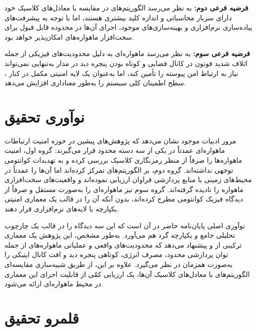 \documentclass[a4paper,14pt]{extreport}
\begin{document}
\textbf{فرضیه فرعی دوم:} به نظر می‌رسد الگوریتم‌های  در مقایسه با معادل‌های کلاسیک خود دارای سربار محاسباتی و اندازه کلید بیشتری هستند، اما با توجه به پیشرفت‌های پیاده‌سازی نرم‌افزاری و بهینه‌سازی‌های موجود، اجرای آن‌ها در محدوده قابل قبول برای سخت‌افزار ماهواره‌های  امکان‌پذیر خواهد بود.

\textbf{فرضیه فرعی سوم:} به نظر می‌رسد  ماهواره‌ای به دلیل محدودیت‌های فیزیکی  از جمله اتلاف شدید فوتون در کانال فضایی و کوتاه بودن پنجره دید در مدار   به‌تنهایی نمی‌تواند نیاز به ارتباط امن پیوسته را تأمین کند، اما به‌عنوان یک لایه امنیتی مکمل در کنار ، سطح اطمینان کلی سیستم را به‌طور معناداری افزایش می‌دهد.

\section{نوآوری تحقیق}

مرور ادبیات موجود نشان می‌دهد که پژوهش‌های پیشین در حوزه امنیت ارتباطات ماهواره‌ای عمدتاً در یکی از سه دسته محدود قرار می‌گیرند: گروه اول، امنیت ماهواره‌ها را صرفاً از منظر رمزنگاری کلاسیک  بررسی کرده و به تهدیدات کوانتومی توجهی نداشته‌اند. گروه دوم، بر الگوریتم‌های  تمرکز کرده‌اند اما آن‌ها را عمدتاً در محیط‌های زمینی با منابع پردازشی فراوان ارزیابی نموده‌اند و واقعیت‌های سخت‌افزاری ماهواره را نادیده گرفته‌اند. گروه سوم نیز  ماهواره‌ای را به‌صورت مستقل و صرفاً از دیدگاه فیزیک کوانتومی مطرح کرده‌اند، بدون آنکه آن را در قالب یک معماری امنیتی یکپارچه با لایه‌های نرم‌افزاری قرار دهند.

نوآوری اصلی پایان‌نامه حاضر در آن است که این سه دیدگاه را در قالب یک چارچوب تحلیلی جامع و یکپارچه گرد هم می‌آورد. به‌طور مشخص، این پژوهش یک معماری ترکیبی  از  و  پیشنهاد می‌دهد که محدودیت‌های واقعی و عملیاتی ماهواره‌های   از جمله توان پردازشی محدود، مصرف انرژی، کوتاهی پنجره دید و افت کانال اپتیکی  را به‌صورت همزمان در نظر می‌گیرد. علاوه بر این، از طریق شبیه‌سازی مقایسه‌ای الگوریتم‌های  با معادل‌های کلاسیک آن‌ها، یک ارزیابی کمّی از قابلیت اجرای این معماری در محیط ماهواره‌ای ارائه می‌شود.

\section{قلمرو تحقیق}
\end{document}
